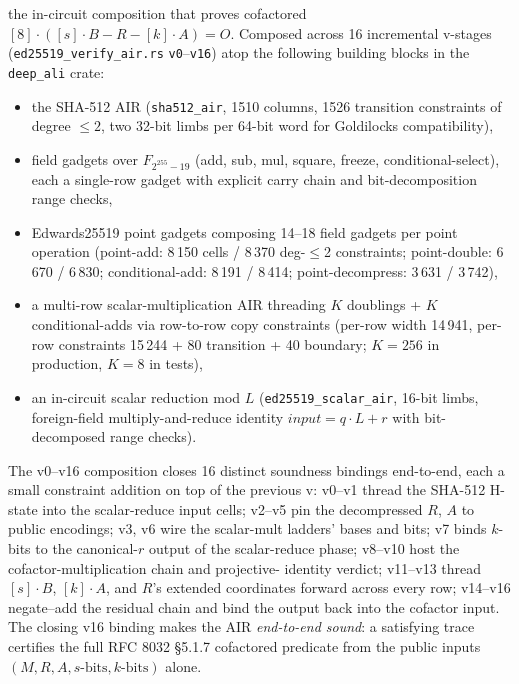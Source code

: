 \documentclass[11pt,a4paper]{article}
\theoremstyle{definition}
\theoremstyle{plain}
\begin{document}
\begin{description}[leftmargin=2em,style=nextline]
  \item[Layer 3 — \emph{Ed25519VerifyAir} (landed):]
        the in-circuit composition that proves cofactored
        $[8] \cdot ([s]\!\cdot\!B - R - [k]\!\cdot\!A) = O$.  Composed
        across 16 incremental v-stages (\texttt{ed25519\_verify\_air.rs}
        \texttt{v0}--\texttt{v16}) atop the following building blocks
        in the \texttt{deep\_ali} crate:
        \begin{itemize}[leftmargin=*]
          \item the SHA-512 AIR (\texttt{sha512\_air}, 1510 columns,
                1526 transition constraints of degree $\le 2$, two
                32-bit limbs per 64-bit word for Goldilocks
                compatibility),
          \item field gadgets over $F_{2^{255}-19}$ (add, sub, mul,
                square, freeze, conditional-select), each a single-row
                gadget with explicit carry chain and bit-decomposition
                range checks,
          \item Edwards25519 point gadgets composing 14--18 field
                gadgets per point operation (point-add: 8\,150
                cells / 8\,370 deg-$\le$2 constraints; point-double:
                6\,670 / 6\,830; conditional-add: 8\,191 / 8\,414;
                point-decompress: 3\,631 / 3\,742),
          \item a multi-row scalar-multiplication AIR threading $K$
                doublings + $K$ conditional-adds via row-to-row copy
                constraints (per-row width 14\,941, per-row constraints
                15\,244 + 80 transition + 40 boundary; $K=256$ in
                production, $K=8$ in tests),
          \item an in-circuit scalar reduction mod $L$
                (\texttt{ed25519\_scalar\_air}, 16-bit limbs, foreign-field
                multiply-and-reduce identity \mbox{$\mathit{input} = q\cdot L + r$}
                with bit-decomposed range checks).
        \end{itemize}

        The v0--v16 composition closes 16 distinct soundness bindings
        end-to-end, each a small constraint addition on top of the
        previous v:
        v0--v1 thread the SHA-512 H-state into the scalar-reduce input
        cells; v2--v5 pin the decompressed $R$, $A$ to public encodings;
        v3, v6 wire the scalar-mult ladders' bases and bits; v7 binds
        $k$-bits to the canonical-$r$ output of the scalar-reduce phase;
        v8--v10 host the cofactor-multiplication chain and projective-
        identity verdict; v11--v13 thread $[s]\!\cdot\!B$, $[k]\!\cdot\!A$,
        and $R$'s extended coordinates forward across every row;
        v14--v16 negate--add the residual chain and bind the output back
        into the cofactor input.  The closing v16 binding makes the AIR
        \emph{end-to-end sound}: a satisfying trace certifies the
        full RFC 8032 \S5.1.7 cofactored predicate from the public
        inputs $(M, R, A, s\text{-bits}, k\text{-bits})$ alone.


\end{description}
\end{document}
